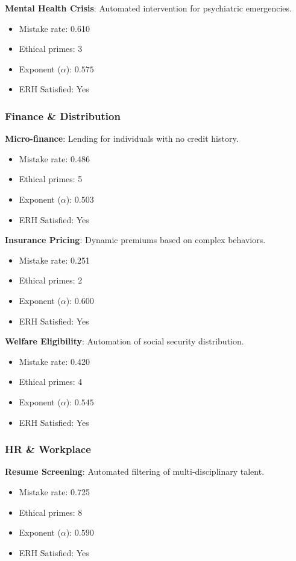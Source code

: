 \documentclass[12pt,a4paper]{article}
\theoremstyle{definition}
\theoremstyle{remark}
\begin{document}
\textbf{Mental Health Crisis}: Automated intervention for psychiatric emergencies.
\begin{itemize}
    \item Mistake rate: 0.610
    \item Ethical primes: 3
    \item Exponent ($\alpha$): $0.575$
    \item ERH Satisfied: Yes
\end{itemize}

\subsubsection{Finance \& Distribution}

\textbf{Micro-finance}: Lending for individuals with no credit history.
\begin{itemize}
    \item Mistake rate: 0.486
    \item Ethical primes: 5
    \item Exponent ($\alpha$): $0.503$
    \item ERH Satisfied: Yes
\end{itemize}

\textbf{Insurance Pricing}: Dynamic premiums based on complex behaviors.
\begin{itemize}
    \item Mistake rate: 0.251
    \item Ethical primes: 2
    \item Exponent ($\alpha$): $0.600$
    \item ERH Satisfied: Yes
\end{itemize}

\textbf{Welfare Eligibility}: Automation of social security distribution.
\begin{itemize}
    \item Mistake rate: 0.420
    \item Ethical primes: 4
    \item Exponent ($\alpha$): $0.545$
    \item ERH Satisfied: Yes
\end{itemize}

\subsubsection{HR \& Workplace}

\textbf{Resume Screening}: Automated filtering of multi-disciplinary talent.
\begin{itemize}
    \item Mistake rate: 0.725
    \item Ethical primes: 8
    \item Exponent ($\alpha$): $0.590$
    \item ERH Satisfied: Yes
\end{itemize}
\end{document}
